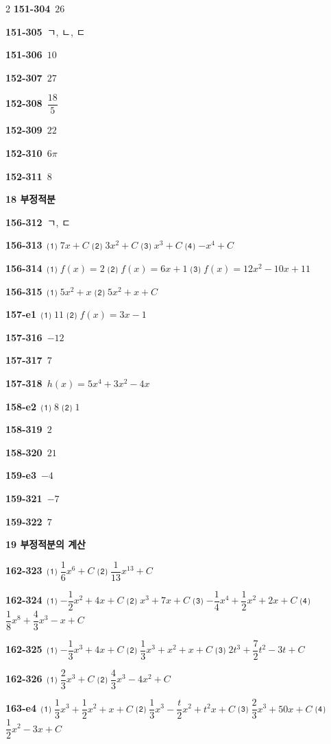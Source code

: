\documentclass[10pt,a4paper]{article}
\begin{document}
\begin{multicols}{2}
\noindent\textbf{151-304}\ $26$\par
\noindent\textbf{151-305}\ ㄱ, ㄴ, ㄷ\par
\noindent\textbf{151-306}\ $10$\par
\noindent\textbf{152-307}\ $27$\par
\noindent\textbf{152-308}\ $\dfrac{18}{5}$\par
\noindent\textbf{152-309}\ $22$\par
\noindent\textbf{152-310}\ $6\pi$\par
\noindent\textbf{152-311}\ $8$\par
\noindent\textbf{18 부정적분}\par\smallskip
\noindent\textbf{156-312}\ ㄱ, ㄷ\par
\noindent\textbf{156-313}\ ⑴ $7x+C$ ⑵ $3x^2+C$ ⑶ $x^3+C$ ⑷ $-x^4+C$\par
\noindent\textbf{156-314}\ ⑴ $f(x)=2$ ⑵ $f(x)=6x+1$ ⑶ $f(x)=12x^2-10x+11$\par
\noindent\textbf{156-315}\ ⑴ $5x^2+x$ ⑵ $5x^2+x+C$\par
\noindent\textbf{157-e1}\ ⑴ $11$ ⑵ $f(x)=3x-1$\par
\noindent\textbf{157-316}\ $-12$\par
\noindent\textbf{157-317}\ $7$\par
\noindent\textbf{157-318}\ $h(x)=5x^4+3x^2-4x$\par
\noindent\textbf{158-e2}\ ⑴ $8$ ⑵ $1$\par
\noindent\textbf{158-319}\ $2$\par
\noindent\textbf{158-320}\ $21$\par
\noindent\textbf{159-e3}\ $-4$\par
\noindent\textbf{159-321}\ $-7$\par
\noindent\textbf{159-322}\ $7$\par
\noindent\textbf{19 부정적분의 계산}\par\smallskip
\noindent\textbf{162-323}\ ⑴ $\dfrac{1}{6}x^6+C$ ⑵ $\dfrac{1}{13}x^{13}+C$\par
\noindent\textbf{162-324}\ ⑴ $-\dfrac{1}{2}x^2+4x+C$ ⑵ $x^3+7x+C$ ⑶ $-\dfrac{1}{4}x^4+\dfrac{1}{2}x^2+2x+C$ ⑷ $\dfrac{1}{8}x^8+\dfrac{4}{3}x^3-x+C$\par
\noindent\textbf{162-325}\ ⑴ $-\dfrac{1}{3}x^3+4x+C$ ⑵ $\dfrac{1}{3}x^3+x^2+x+C$ ⑶ $2t^3+\dfrac{7}{2}t^2-3t+C$\par
\noindent\textbf{162-326}\ ⑴ $\dfrac{2}{3}x^3+C$ ⑵ $\dfrac{4}{3}x^3-4x^2+C$\par
\noindent\textbf{163-e4}\ ⑴ $\dfrac{1}{3}x^3+\dfrac{1}{2}x^2+x+C$ ⑵ $\dfrac{1}{3}x^3-\dfrac{t}{2}x^2+t^2x+C$ ⑶ $\dfrac{2}{3}x^3+50x+C$ ⑷ $\dfrac{1}{2}x^2-3x+C$\par

\end{multicols}
\end{document}
